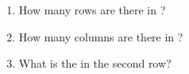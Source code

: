 \begin{itemize}
\begin{enumerate}

\item How many rows are there in ?\\

\item How many columns are there in ?\\

\item What is the  in the second row?\\
\end{enumerate}
\end{itemize}


